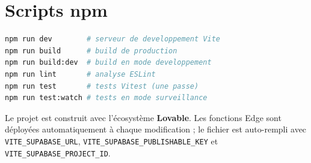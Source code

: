 \section{Scripts npm}
\begin{lstlisting}[language=bash,caption={package.json --- scripts}]
npm run dev        # serveur de developpement Vite
npm run build      # build de production
npm run build:dev  # build en mode developpement
npm run lint       # analyse ESLint
npm run test       # tests Vitest (une passe)
npm run test:watch # tests en mode surveillance
\end{lstlisting}

\begin{notebox}
Le projet est construit avec l'écosystème \textbf{Lovable}. Les fonctions Edge
sont déployées automatiquement à chaque modification ; le fichier 
est auto-rempli avec \texttt{VITE\_SUPABASE\_URL},
\texttt{VITE\_SUPABASE\_PUBLISHABLE\_KEY} et \texttt{VITE\_SUPABASE\_PROJECT\_ID}.
\end{notebox}
